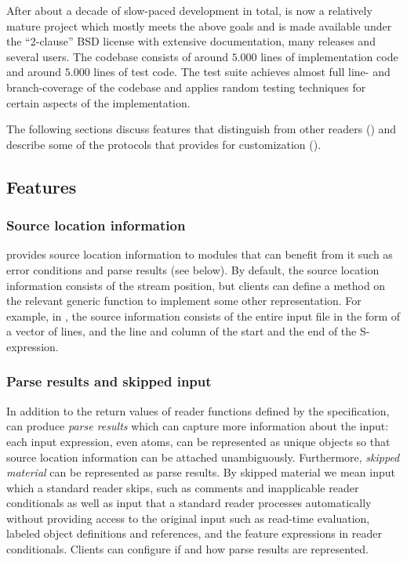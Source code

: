 After about a decade of slow-paced development in total, \eclector{}
is now a relatively mature project which mostly meets the above goals
and is made available under the ``2-clause'' BSD license with
extensive documentation, many releases and several users.  The
codebase consists of around $5.000$ lines of implementation code and
around $5.000$ lines of test code.  The test suite achieves almost
full line- and branch-coverage of the codebase and applies random
testing techniques for certain aspects of the implementation.

The following sections discuss features that distinguish \eclector{}
from other \cl{} readers () and describe some of
the protocols that \eclector{} provides for customization
().

\subsection{Features}
\label{sec:features}

\subsubsection{Source location information}
\label{sec:source-information}

\eclector{} provides source location information to modules that can
benefit from it such as error conditions and parse results (see
below).  By default, the source location information consists of the
stream position, but clients can define a method on the relevant
generic function to implement some other representation.  For example,
in \sicl{}, the source information consists of the entire input file
in the form of a vector of lines, and the line and column of the start
and the end of the S-expression.

\subsubsection{Parse results and skipped input}

In addition to the return values of reader functions defined by the
\cl{} specification, \eclector{} can produce \emph{parse results}
which can capture more information about the input: each input
expression, even atoms, can be represented as unique objects so that
source location information can be attached unambiguously.
Furthermore, \emph{skipped material} can be represented as parse
results.  By skipped material we mean input which a standard reader
skips, such as comments and inapplicable reader conditionals as well
as input that a standard reader processes automatically without
providing access to the original input such as read-time evaluation,
labeled object definitions and references, and the feature expressions
in reader conditionals.  Clients can configure if and how parse
results are represented.

